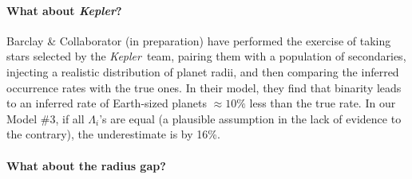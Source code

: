 \paragraph{What about {\it Kepler}?}
Barclay \& Collaborator (in preparation) have performed the exercise 
of taking stars selected by the {\it Kepler}\ team, pairing them with a 
population of secondaries, injecting a realistic distribution of planet radii, 
and then comparing the inferred occurrence rates with the true ones.
In their model, they find that binarity leads to an inferred rate of 
Earth-sized planets $\approx 10\%$ less than the true rate.
In our Model \#3, if all $\Lambda_i$'s are equal (a plausible assumption in 
the lack of evidence to the contrary), the underestimate is by 16\%.


\paragraph{What about the radius gap?}
